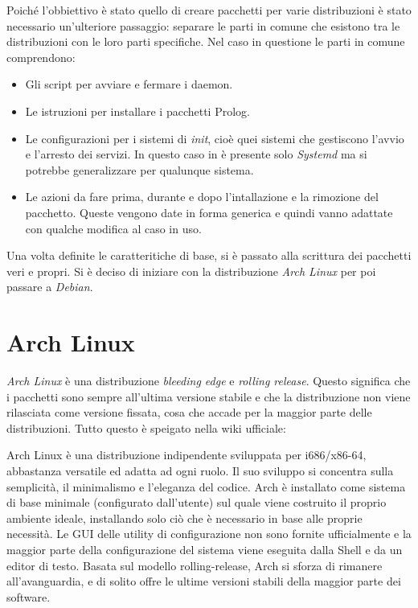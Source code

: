 \documentclass[10pt,titlepage,twoside,a4paper]{report}
\begin{document}
Poiché l'obbiettivo è stato quello di creare pacchetti per varie 
distribuzioni è stato necessario un'ulteriore passaggio: separare le parti in 
comune che esistono tra le distribuzioni con le loro parti specifiche. Nel 
caso in questione le parti in comune comprendono:
\begin{itemize}
    \item Gli script per avviare e fermare i daemon.
    \item Le istruzioni per installare i pacchetti Prolog.
    \item Le configurazioni per i sistemi di \emph{init}, cioè quei sistemi 
che gestiscono l'avvio e l'arresto dei servizi. In questo caso in è 
presente solo \emph{Systemd} ma si potrebbe generalizzare per qualunque 
sistema.
    \item Le azioni da fare prima, durante e dopo l'intallazione e la rimozione 
del pacchetto. Queste vengono date in forma generica e quindi vanno adattate 
con qualche modifica al caso in uso.
\end{itemize}

Una volta definite le caratteritiche di base, si è passato alla scrittura dei
pacchetti veri e propri. Si è deciso di iniziare con la
distribuzione \emph{Arch Linux} per poi passare a \emph{Debian}.


\section{Arch Linux}
\emph{Arch Linux} è una distribuzione \emph{bleeding edge} e \emph{rolling 
release}. Questo significa che i pacchetti sono sempre all'ultima versione 
stabile e che la distribuzione non viene rilasciata come versione fissata, 
cosa che accade per la maggior parte delle distribuzioni. Tutto questo è 
speigato nella wiki ufficiale\cite{archLinux}:
\begin{displayquote}
Arch Linux è una distribuzione indipendente sviluppata per i686/x86-64, 
abbastanza versatile ed adatta ad ogni ruolo. Il suo sviluppo si concentra 
sulla semplicità, il minimalismo e l'eleganza del codice. Arch è installato 
come sistema di base minimale (configurato dall'utente) sul quale viene 
costruito il proprio ambiente ideale, installando solo ciò che è necessario 
in base alle proprie necessità. Le GUI delle utility di configurazione non 
sono fornite ufficialmente e la maggior parte della configurazione del sistema viene 
eseguita dalla Shell e da un editor di testo. Basata sul modello 
rolling-release, Arch si sforza di rimanere all'avanguardia, e di solito offre 
le ultime versioni stabili della maggior parte dei software.
\end{displayquote}
\end{document}
